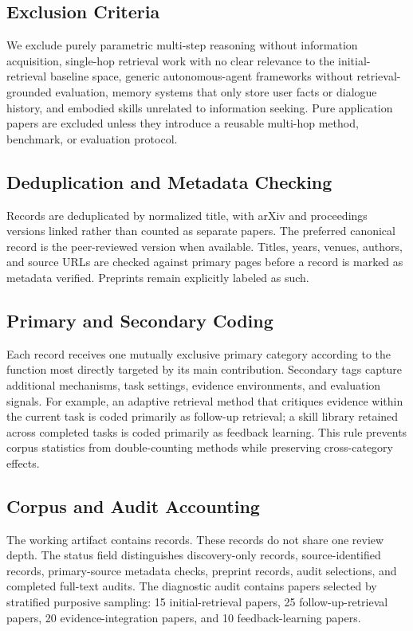 \subsection{Exclusion Criteria}
We exclude purely parametric multi-step reasoning without information acquisition, single-hop retrieval work with no clear relevance to the initial-retrieval baseline space, generic autonomous-agent frameworks without retrieval-grounded evaluation, memory systems that only store user facts or dialogue history, and embodied skills unrelated to information seeking. Pure application papers are excluded unless they introduce a reusable multi-hop method, benchmark, or evaluation protocol.

\subsection{Deduplication and Metadata Checking}
Records are deduplicated by normalized title, with arXiv and proceedings versions linked rather than counted as separate papers. The preferred canonical record is the peer-reviewed version when available. Titles, years, venues, authors, and source URLs are checked against primary pages before a record is marked as metadata verified. Preprints remain explicitly labeled as such.

\subsection{Primary and Secondary Coding}
Each record receives one mutually exclusive primary category according to the function most directly targeted by its main contribution. Secondary tags capture additional mechanisms, task settings, evidence environments, and evaluation signals. For example, an adaptive retrieval method that critiques evidence within the current task is coded primarily as follow-up retrieval; a skill library retained across completed tasks is coded primarily as feedback learning. This rule prevents corpus statistics from double-counting methods while preserving cross-category effects.

\subsection{Corpus and Audit Accounting}
The working artifact contains \CorpusSize{} records. These records do not share one review depth. The status field distinguishes discovery-only records, source-identified records, primary-source metadata checks, preprint records, audit selections, and completed full-text audits. The diagnostic audit contains \AuditSize{} papers selected by stratified purposive sampling: 15 initial-retrieval papers, 25 follow-up-retrieval papers, 20 evidence-integration papers, and 10 feedback-learning papers.

